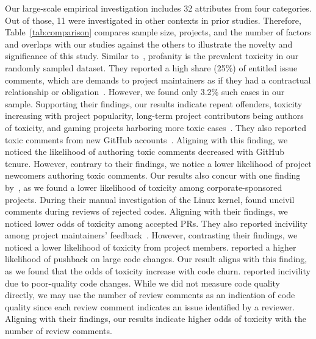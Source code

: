 Our large-scale empirical investigation includes 32 attributes from four categories. Out of those, 11 were investigated in other contexts in prior studies. Therefore, Table~\ref{tab:comparison} compares sample size, projects, and the number of factors and overlaps with our studies against the others to illustrate the novelty and significance of this study. Similar to~\citet{miller2022did}, profanity is the prevalent toxicity in our randomly sampled dataset. They reported a high share (25\%) of entitled issue comments, which are demands to project maintainers as if they had a contractual relationship or obligation~\cite{miller2022did}. However, we found only 3.2\% such cases in our sample. Supporting their findings, our results indicate repeat offenders, toxicity increasing with project popularity, long-term project contributors being authors of toxicity, and gaming projects harboring more toxic cases~\cite{miller2022did}. They also reported toxic comments from new GitHub accounts~\cite{miller2022did}. Aligning with this finding, we noticed the likelihood of authoring toxic comments decreased with GitHub tenure.
However, contrary to their findings, we notice a lower likelihood of project newcomers authoring toxic comments.
Our results also concur with one finding by~\citet{raman2020stress}, as we found a lower likelihood of toxicity among corporate-sponsored projects.
During their manual investigation of the Linux kernel, \citet{ferreira2021shut} found uncivil comments during reviews of rejected codes. Aligning with their findings, we noticed lower odds of toxicity among accepted PRs. They also reported incivility among project maintainers' feedback~\cite{ferreira2021shut}. However, contrasting their findings, we noticed a lower likelihood of toxicity from project members.
\citet{egelman2020predicting} reported a higher likelihood of pushback on large code changes. Our result aligns with this finding, as we found that the odds of toxicity increase with code churn.
\citet{raman2020stress} reported incivility due to poor-quality code changes. While we did not measure code quality directly, we may use the number of review comments as an indication of code quality since each review comment indicates an issue identified by a reviewer. Aligning with their findings, our results indicate higher odds of toxicity with the number of review comments.


